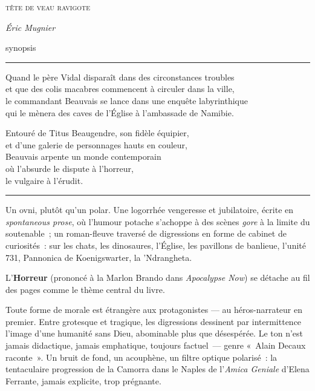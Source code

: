 \documentclass[12pt,a4paper]{article}
\begin{document}
\begin{center}
{\scshape\large tête de veau ravigote}

\smallskip
{\itshape Éric Mugnier}

\smallskip
{\small synopsis}
\end{center}

\vspace{10mm}
\noindent\rule{\linewidth}{0.3pt}
\vspace{6mm}

\begin{center}
\begin{minipage}{0.82\linewidth}
Quand le père Vidal disparaît dans des circonstances troubles\\
et que des colis macabres commencent à circuler dans la ville,\\
le commandant Beauvais se lance dans une enquête labyrinthique\\
qui le mènera des caves de l'Église à l'ambassade de Namibie.

\medskip
Entouré de Titus Beaugendre, son fidèle équipier,\\
et d'une galerie de personnages hauts en couleur,\\
Beauvais arpente un monde contemporain\\
où l'absurde le dispute à l'horreur,\\
le vulgaire à l'érudit.
\end{minipage}
\end{center}

\vspace{6mm}
\noindent\rule{\linewidth}{0.3pt}
\vspace{8mm}

Un ovni, plutôt qu'un polar. Une logorrhée vengeresse et jubilatoire, écrite en \textit{spontaneous prose}, où l'humour potache s'achoppe à des scènes \textit{gore} à la limite du soutenable~; un roman-fleuve traversé de digressions en forme de cabinet de curiosités~: sur les chats, les dinosaures, l'Église, les pavillons de banlieue, l'unité 731, Pannonica de Koenigswarter, la 'Ndrangheta.

L'\textbf{Horreur} (prononcé à la Marlon Brando dans \textit{Apocalypse Now}) se détache au fil des pages comme le thème central du livre.

Toute forme de morale est étrangère aux protagonistes — au héros-narrateur en premier. Entre grotesque et tragique, les digressions dessinent par intermittence l'image d'une humanité sans Dieu, abominable plus que désespérée. Le ton n'est jamais didactique, jamais emphatique, toujours factuel~— genre «~Alain Decaux raconte~». Un bruit de fond, un acouphène, un filtre optique polarisé~: la tentaculaire progression de la Camorra dans le Naples de l'\textit{Amica Geniale} d'Elena Ferrante, jamais explicite, trop prégnante.
\end{document}
